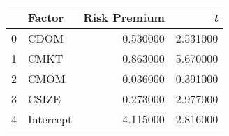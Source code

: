 \begin{tabular}{llrr}
\toprule
 & Factor & Risk Premium & \emph{t} \\
\midrule
0 & CDOM & 0.530000 & 2.531000 \\
1 & CMKT & 0.863000 & 5.670000 \\
2 & CMOM & 0.036000 & 0.391000 \\
3 & CSIZE & 0.273000 & 2.977000 \\
4 & Intercept & 4.115000 & 2.816000 \\
\bottomrule
\end{tabular}
